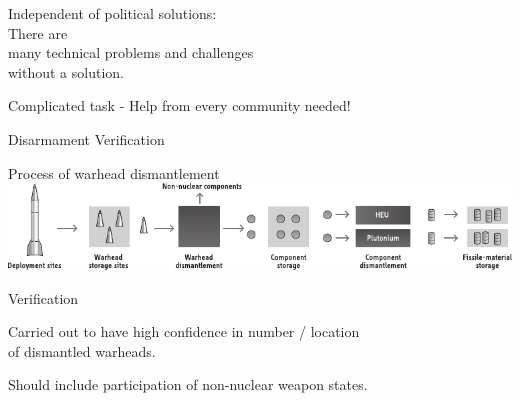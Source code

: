 \documentclass[presentation]{beamer}
\begin{document}
\begin{frame}[label=sec-2-3]{}

\begin{center}
Independent of political solutions: \\[0.3em]
\Large
There are\\ many technical problems and challenges\\ without a solution.\\[1em]

\pause

Complicated task - Help from every community needed!
\end{center}
\end{frame}

\begin{frame}[label=sec-2-4]{Disarmament Verification}
\begin{varblock}[\textwidth]{}
\centering
Process of warhead dismantlement\\[0.7em]
 \includegraphics[width=\textwidth]{images/warhead_dismantlement}
\end{varblock}


\begin{block}{Verification}
\begin{center}
Carried out to have high confidence in number / location\\ of dismantled warheads.

Should include participation of non-nuclear weapon states.
\end{center}
\end{block}
\end{frame}
\end{document}
